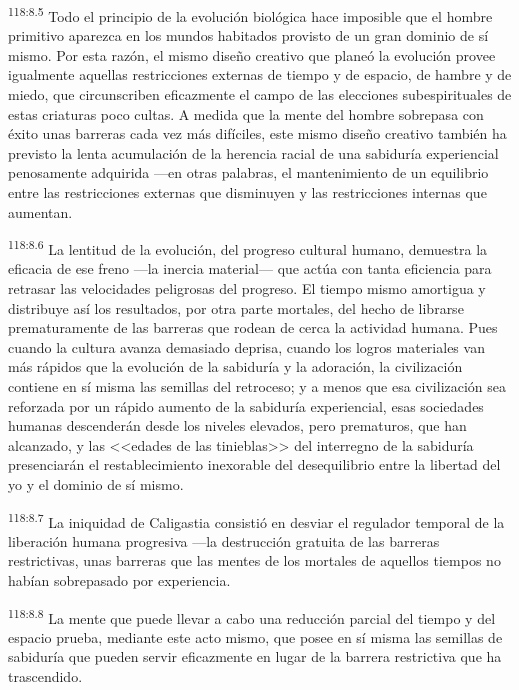\documentclass[twoside, 11pt]{book}
\begin{document}
\par
\textsuperscript{118:8.5} Todo el principio de la evolución biológica hace imposible que el hombre primitivo aparezca en los mundos habitados provisto de un gran dominio de sí mismo. Por esta razón, el mismo diseño creativo que planeó la evolución provee igualmente aquellas restricciones externas de tiempo y de espacio, de hambre y de miedo, que circunscriben eficazmente el campo de las elecciones subespirituales de estas criaturas poco cultas. A medida que la mente del hombre sobrepasa con éxito unas barreras cada vez más difíciles, este mismo diseño creativo también ha previsto la lenta acumulación de la herencia racial de una sabiduría experiencial penosamente adquirida ---en otras palabras, el mantenimiento de un equilibrio entre las restricciones externas que disminuyen y las restricciones internas que aumentan.

\par
\textsuperscript{118:8.6} La lentitud de la evolución, del progreso cultural humano, demuestra la eficacia de ese freno ---la inercia material--- que actúa con tanta eficiencia para retrasar las velocidades peligrosas del progreso. El tiempo mismo amortigua y distribuye así los resultados, por otra parte mortales, del hecho de librarse prematuramente de las barreras que rodean de cerca la actividad humana. Pues cuando la cultura avanza demasiado deprisa, cuando los logros materiales van más rápidos que la evolución de la sabiduría y la adoración, la civilización contiene en sí misma las semillas del retroceso; y a menos que esa civilización sea reforzada por un rápido aumento de la sabiduría experiencial, esas sociedades humanas descenderán desde los niveles elevados, pero prematuros, que han alcanzado, y las <<edades de las tinieblas>> del interregno de la sabiduría presenciarán el restablecimiento inexorable del desequilibrio entre la libertad del yo y el dominio de sí mismo.

\par
\textsuperscript{118:8.7} La iniquidad de Caligastia consistió en desviar el regulador temporal de la liberación humana progresiva ---la destrucción gratuita de las barreras restrictivas, unas barreras que las mentes de los mortales de aquellos tiempos no habían sobrepasado por experiencia.

\par
\textsuperscript{118:8.8} La mente que puede llevar a cabo una reducción parcial del tiempo y del espacio prueba, mediante este acto mismo, que posee en sí misma las semillas de sabiduría que pueden servir eficazmente en lugar de la barrera restrictiva que ha trascendido.
\end{document}
